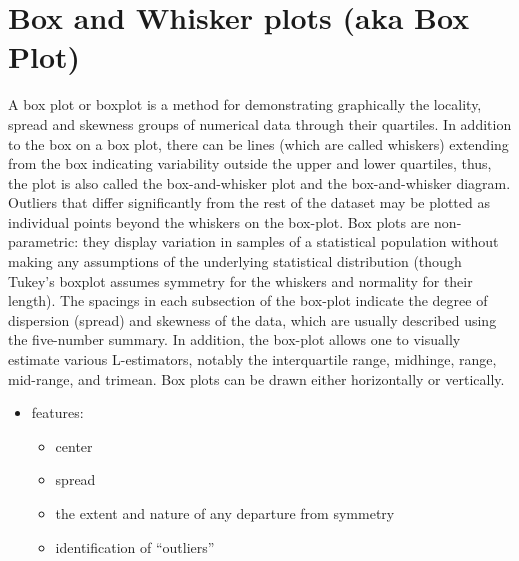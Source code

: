 \section{Box and Whisker plots (aka Box Plot)}\label{Box and Whisker plots (aka Box Plot)}
A box plot or boxplot is a method for demonstrating graphically the locality, spread and skewness groups of numerical data through their quartiles. In addition to the box on a box plot, there can be lines (which are called whiskers) extending from the box indicating variability outside the upper and lower quartiles, thus, the plot is also called the box-and-whisker plot and the box-and-whisker diagram. Outliers that differ significantly from the rest of the dataset may be plotted as individual points beyond the whiskers on the box-plot. Box plots are non-parametric: they display variation in samples of a statistical population without making any assumptions of the underlying statistical distribution (though Tukey's boxplot assumes symmetry for the whiskers and normality for their length). The spacings in each subsection of the box-plot indicate the degree of dispersion (spread) and skewness of the data, which are usually described using the five-number summary. In addition, the box-plot allows one to visually estimate various L-estimators, notably the interquartile range, midhinge, range, mid-range, and trimean. Box plots can be drawn either horizontally or vertically.

\begin{itemize}
    \item features:
    \begin{itemize}
        \item center
        \item spread
        \item the extent and nature of any departure from symmetry
        \item identification of “outliers”
    \end{itemize}
\end{itemize}

